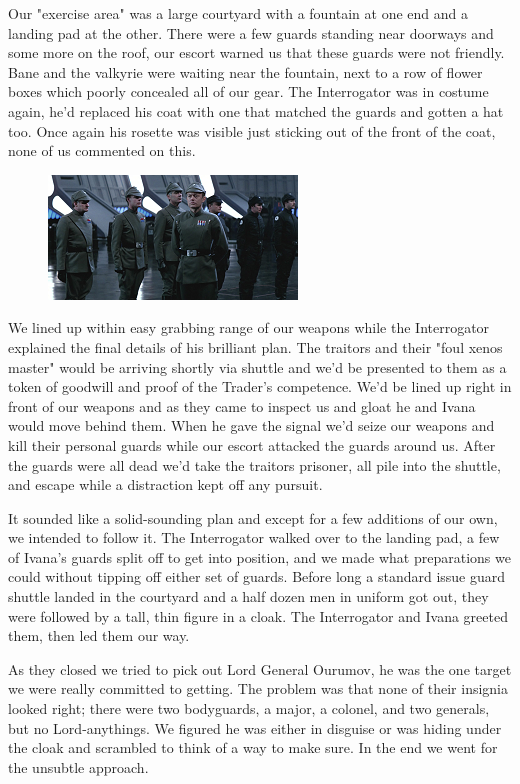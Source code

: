 Our "exercise area" was a large courtyard with a fountain at one end and a landing pad at the other. 
There were a few guards standing near doorways and some more on the roof, our escort warned us that these guards were not friendly. 
Bane and the valkyrie were waiting near the fountain, next to a row of flower boxes which poorly concealed all of our gear. 
The Interrogator was in costume again, he'd replaced his coat with one that matched the guards and gotten a hat too. 
Once again his rosette was visible just sticking out of the front of the coat, none of us commented on this.

\begin{figure}
	\begin{center}
		\includegraphics[width=\figwidth]{pics/9/46.png}
	\end{center}
\end{figure}
We lined up within easy grabbing range of our weapons while the Interrogator explained the final details of his brilliant plan. 
The traitors and their "foul xenos master" would be arriving shortly via shuttle and we'd be presented to them as a token of goodwill and proof of the Trader's competence. 
We'd be lined up right in front of our weapons and as they came to inspect us and gloat he and Ivana would move behind them. 
When he gave the signal we'd seize our weapons and kill their personal guards while our escort attacked the guards around us. 
After the guards were all dead we'd take the traitors prisoner, all pile into the shuttle, and escape while a distraction kept off any pursuit.

It sounded like a solid-sounding plan and except for a few additions of our own, we intended to follow it. 
The Interrogator walked over to the landing pad, a few of Ivana's guards split off to get into position, and we made what preparations we could without tipping off either set of guards. 
Before long a standard issue guard shuttle landed in the courtyard and a half dozen men in uniform got out, they were followed by a tall, thin figure in a cloak. 
The Interrogator and Ivana greeted them, then led them our way.

As they closed we tried to pick out Lord General Ourumov, he was the one target we were really committed to getting. 
The problem was that none of their insignia looked right; 
there were two bodyguards, a major, a colonel, and two generals, but no Lord-anythings. 
We figured he was either in disguise or was hiding under the cloak and scrambled to think of a way to make sure. 
In the end we went for the unsubtle approach.

